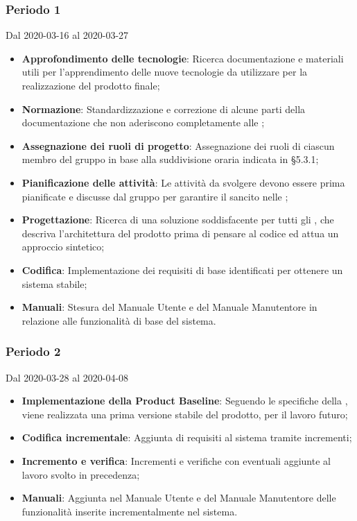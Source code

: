 \subsubsection{Periodo 1} 
Dal 2020-03-16 al 2020-03-27\\
\begin{itemize}
	\item \textbf{Approfondimento delle tecnologie}: Ricerca documentazione e materiali utili per l'apprendimento delle nuove tecnologie da utilizzare per la realizzazione del prodotto finale;
	\item \textbf{Normazione}: Standardizzazione e correzione di alcune parti della documentazione che non aderiscono completamente alle \NdP{};
	\item \textbf{Assegnazione dei ruoli di progetto}: Assegnazione dei ruoli di ciascun membro del gruppo in base alla suddivisione oraria indicata in §5.3.1;
	\item \textbf{Pianificazione delle attività}: Le attività da svolgere devono essere prima pianificate e discusse dal gruppo per garantire il  sancito nelle \NdP{};
	\item \textbf{Progettazione}: Ricerca di una soluzione soddisfacente per tutti gli , che descriva l'architettura del prodotto prima di pensare al codice ed attua un approccio sintetico;
	\item \textbf{Codifica}: Implementazione dei requisiti di base identificati per ottenere un sistema stabile;
	\item \textbf{Manuali}: Stesura del Manuale Utente e del Manuale Manutentore in relazione alle funzionalità di base del sistema.
\end{itemize}
\subsubsection{Periodo 2} 
Dal 2020-03-28 al 2020-04-08\\
\begin{itemize}
	\item \textbf{Implementazione della Product Baseline}: Seguendo le specifiche della , viene realizzata una prima versione stabile del prodotto,  per il lavoro futuro;
	\item \textbf{Codifica incrementale}: Aggiunta di requisiti al sistema tramite incrementi;
	\item \textbf{Incremento e verifica}: Incrementi e verifiche con eventuali aggiunte al lavoro svolto in precedenza;
	\item \textbf{Manuali}: Aggiunta nel Manuale Utente e del Manuale Manutentore delle funzionalità inserite incrementalmente nel sistema.
\end{itemize}
